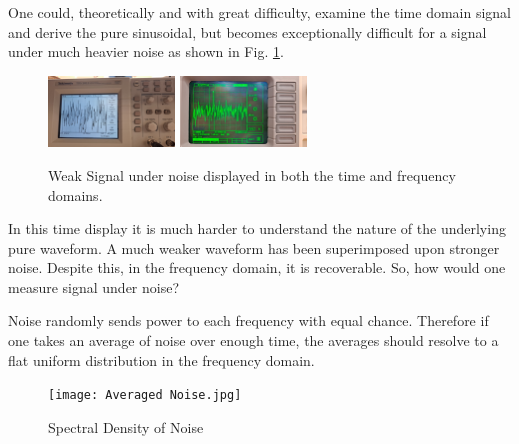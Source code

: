 \documentclass[prl,twocolumn,superscriptaddress,floatfix]{revtex4}
\begin{document}
One could, theoretically and with great difficulty, examine the time domain signal and derive the pure sinusoidal, but
becomes exceptionally difficult for a signal under much heavier noise as shown in Fig. \ref{fig:2}. 

\begin{figure}[H]
    \begin{center}
    \includegraphics[width = 0.3\textwidth]{Time Data C.jpg}
    \includegraphics[width = 0.3\textwidth]{Signal C under Noise.jpg}
    \caption{\label{fig:2}Weak Signal under noise displayed in both the time and frequency domains.}
    \end{center}
\end{figure}

In this time display it is much harder to understand the nature of the underlying pure waveform.
A much weaker waveform has been superimposed upon stronger noise.
Despite this, in the frequency domain, it is recoverable. So, how would one measure signal under noise?

Noise randomly sends power to each frequency with equal chance.
Therefore if one takes an average of noise over enough time, the averages should resolve to a flat uniform distribution in the frequency domain.

 \begin{figure}[H]
     \centering
     \texttt{[image: Averaged Noise.jpg]}
     \caption{Spectral Density of Noise}
     \label{fig:fig 3}
 \end{figure}
\end{document}
